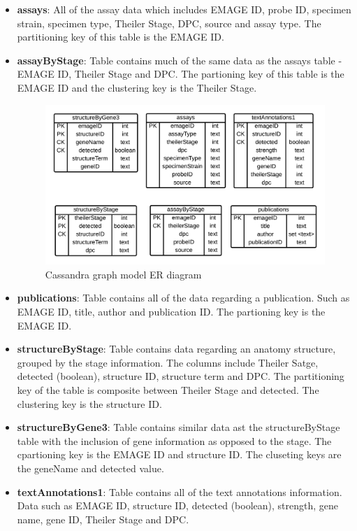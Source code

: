 \begin{itemize}
\item \textbf{assays}: All of the assay data which includes EMAGE ID, probe ID, specimen strain, specimen type, Theiler Stage, DPC, source and assay type. The partitioning key of this table is the EMAGE ID.
\item \textbf{assayByStage}: Table contains much of the same data as the assays table - EMAGE ID, Theiler Stage and DPC. The partioning key of this table is the EMAGE ID and the clustering key is the Theiler Stage.

\begin{figure}[H]\begin{center}\includegraphics[width=1\linewidth]{images/cass_model_er}\caption{Cassandra graph model ER diagram}\label{fig:cass1}\end{center}\end{figure}

\item \textbf{publications}: Table contains all of the data regarding a publication. Such as EMAGE ID, title, author and publication ID. The partioning key is the EMAGE ID.
\item \textbf{structureByStage}: Table contains data regarding an anatomy structure, grouped by the stage information. The columns include Theiler Satge, detected (boolean), structure ID, structure term and DPC. The partitioning key of the table is composite between Theiler Stage and detected. The clustering key is the structure ID.
\item \textbf{structureByGene3}: Table contains similar data ast the structureByStage table with the inclusion of gene information as opposed to the stage. The cpartioning key is the EMAGE ID and structure ID. The cluseting keys are the geneName and detected value.
\item \textbf{textAnnotations1}: Table contains all of the text annotations information. Data such as EMAGE ID, structure ID, detected (boolean), strength, gene name, gene ID, Theiler Stage and DPC.
\end{itemize}

